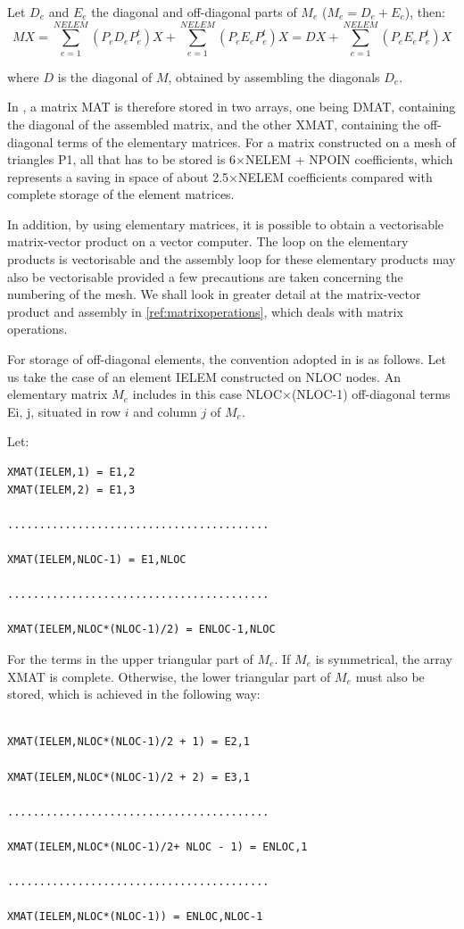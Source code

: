 Let $D_{e}$ and $E_{e}$ the diagonal and off-diagonal parts of $M_{e}$ ($M_{e}
= D_{e} + E_{e}$), then:
\[MX=\sum _{e=1}^{NELEM}(P_{e} D_{e} P_{e}^{t} )X+\sum _{e=1}^{NELEM}(P_{e}
E_{e} P_{e}^{t} )X  =DX+\sum _{e=1}^{NELEM}(P_{e} E_{e} P_{e}^{t} )X \]

where $D$ is the diagonal of $M$, obtained by assembling the diagonals $D_e$.

In \bief, a matrix MAT is therefore stored in two arrays, one being DMAT,
containing the diagonal of the assembled matrix, and the other XMAT, containing
the off-diagonal terms of the elementary matrices. For a matrix constructed on
a mesh of triangles P1, all that has to be stored is 6$\times$NELEM + NPOIN
coefficients, which represents a saving in space of about 2.5$\times$NELEM
coefficients compared with complete storage of the element matrices.

In addition, by using elementary matrices, it is possible to obtain a
vectorisable matrix-vector product on a vector computer. The loop on the
elementary products is vectorisable and the assembly loop for these elementary
products may also be vectorisable provided a few precautions are taken
concerning the numbering of the mesh. We shall look in greater detail at the
matrix-vector product and assembly in \ref{ref:matrixoperations}, which deals
with matrix operations.

For storage of off-diagonal elements, the convention adopted in \bief is as
follows. Let us take the case of an element IELEM constructed on NLOC nodes. An
elementary matrix $M_e$ includes in this case NLOC$\times$(NLOC-1) off-diagonal
terms Ei, j, situated in row $i$ and column $j$ of $M_e$.

Let:
\begin{lstlisting}[language=TelFortran]
XMAT(IELEM,1) = E1,2
XMAT(IELEM,2) = E1,3

.........................................

XMAT(IELEM,NLOC-1) = E1,NLOC

.........................................

XMAT(IELEM,NLOC*(NLOC-1)/2) = ENLOC-1,NLOC
\end{lstlisting}

For the terms in the upper triangular part of $M_e$. If $M_e$ is symmetrical,
the array XMAT is complete. Otherwise, the lower triangular part of $M_e$ must
also be stored, which is achieved in the following way:
\begin{lstlisting}[language=TelFortran]

XMAT(IELEM,NLOC*(NLOC-1)/2 + 1) = E2,1

XMAT(IELEM,NLOC*(NLOC-1)/2 + 2) = E3,1

.........................................

XMAT(IELEM,NLOC*(NLOC-1)/2+ NLOC - 1) = ENLOC,1

.........................................

XMAT(IELEM,NLOC*(NLOC-1)) = ENLOC,NLOC-1
\end{lstlisting}


